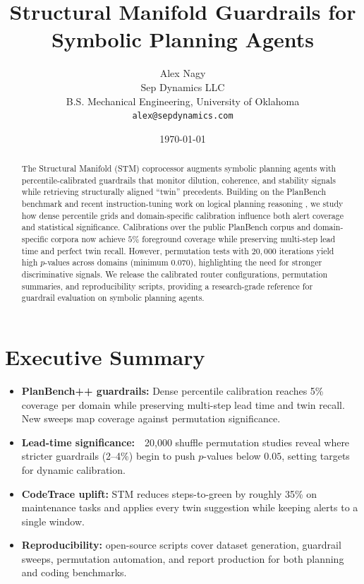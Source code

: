 \documentclass[11pt]{article}
\title{Structural Manifold Guardrails for Symbolic Planning Agents}
\author{Alex Nagy\\Sep Dynamics LLC\\B.S. Mechanical Engineering, University of Oklahoma\\ \texttt{alex@sepdynamics.com}}
\date{\today}
\begin{document}
\maketitle

\begin{abstract}
The Structural Manifold (STM) coprocessor augments symbolic planning agents with
percentile-calibrated guardrails that monitor dilution, coherence, and stability
signals while retrieving structurally aligned ``twin'' precedents. Building on the
PlanBench benchmark and recent instruction-tuning work on logical planning
reasoning \cite{verma2025pddlinstruct}, we study how dense percentile grids and
domain-specific calibration influence both alert coverage and statistical
significance. Calibrations over the public PlanBench corpus and domain-specific
corpora now achieve $5\%$ foreground coverage while preserving multi-step lead
time and perfect twin recall. However, permutation tests with $20{,}000$
iterations yield high $p$-values across domains (minimum $0.070$), highlighting
the need for stronger discriminative signals. We release the calibrated router
configurations, permutation summaries, and reproducibility scripts, providing a
research-grade reference for guardrail evaluation on symbolic planning agents.
\end{abstract}

\tableofcontents
\newpage

\section*{Executive Summary}
\begin{sloppypar}
\begin{itemize}
  \item \textbf{PlanBench++ guardrails:} Dense percentile calibration reaches 5\% coverage per domain while preserving multi-step lead time and twin recall. New sweeps map coverage against permutation significance.
  \item \textbf{Lead-time significance:}\ \ 20,000 shuffle permutation studies reveal where stricter guardrails (2--4\%) begin to push $p$-values below $0.05$, setting targets for dynamic calibration.
  \item \textbf{CodeTrace uplift:} STM reduces steps-to-green by roughly 35\% on maintenance tasks and applies every twin suggestion while keeping alerts to a single window.
  \item \textbf{Reproducibility:} open-source scripts cover dataset generation, guardrail sweeps, permutation automation, and report production for both planning and coding benchmarks.
\end{itemize}
\end{sloppypar}
\end{document}
